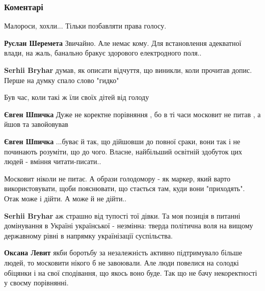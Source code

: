  
 
 
 
 
\subsubsection{Коментарі}
\label{sec:24_11_2021.fb.bryhar_sergej.1.detsad_mova.cmt}

\begin{itemize} %
Малороси, хохли... Тільки позбавляти права голосу.

\begin{itemize} %
\textbf{Руслан Шеремета} Звичайно. Але немає кому. Для встановлення адекватної влади, на жаль, банально бракує здорового електродного поля..

\textbf{Serhii Bryhar} думав, як описати відчуття, що виникли, коли прочитав допис. Перше на думку спало слово "гидко"
\end{itemize} %

Був час, коли такі ж їли своїх дітей від голоду

\begin{itemize} %
\textbf{Євген Шпичка} Дуже не коректне порівняння , бо в ті часи московит не питав , а йшов та завойовував


\textbf{Євген Шпичка} ...буває й так, що дійшовши до повної сраки, вони так і не починають розуміти, що до чого. Власне, найбільший освітній здобуток цих людей - вміння читати-писати..


Московит ніколи не питає. А образи голодомору - як маркер, який варто використовувати, щоби пояснювати, що стається там, куди вони "приходять". Отак може і дійти. А може й не дійти..

\textbf{Serhii Bryhar} аж страшно від тупості тої дівки.
Та моя позиція в питанні домінування в Україні української - незмінна: тверда політична воля на вищому державному рівні в напрямку українізації суспільства.

\textbf{Оксана Левит} якби боротьбу за незалежність активно підтримувало більше людей, то московити нікого б не завоювали. Але люди повелися на солодкі обіцянки і на свої сподівання, що якось воно буде. Так що не бачу некоректності у своєму порівнянні.


\end{itemize}
\end{itemize}

